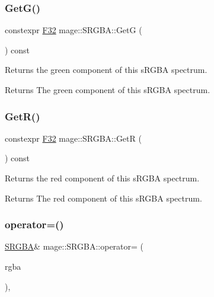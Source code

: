 \subsubsection{\texorpdfstring{Get\+G()}{GetG()}}
{\footnotesize\ttfamily constexpr \mbox{\hyperlink{namespacemage_aa97e833b45f06d60a0a9c4fc22ae02c0}{F32}} mage\+::\+S\+R\+G\+B\+A\+::\+GetG (\begin{DoxyParamCaption}{ }\end{DoxyParamCaption}) const\hspace{0.3cm}{\ttfamily [noexcept]}}

Returns the green component of this s\+R\+G\+BA spectrum.

\begin{DoxyReturn}{Returns}
The green component of this s\+R\+G\+BA spectrum. 
\end{DoxyReturn}
\mbox{\label{structmage_1_1_s_r_g_b_a_a7f88a4619ba00d7a8d8b33e5f07b3b81}} 
\subsubsection{\texorpdfstring{Get\+R()}{GetR()}}
{\footnotesize\ttfamily constexpr \mbox{\hyperlink{namespacemage_aa97e833b45f06d60a0a9c4fc22ae02c0}{F32}} mage\+::\+S\+R\+G\+B\+A\+::\+GetR (\begin{DoxyParamCaption}{ }\end{DoxyParamCaption}) const\hspace{0.3cm}{\ttfamily [noexcept]}}

Returns the red component of this s\+R\+G\+BA spectrum.

\begin{DoxyReturn}{Returns}
The red component of this s\+R\+G\+BA spectrum. 
\end{DoxyReturn}
\mbox{\label{structmage_1_1_s_r_g_b_a_ac21035a9eadad3c0d78364b17692e4fc}} 
\subsubsection{\texorpdfstring{operator=()}{operator=()}\hspace{0.1cm}{\footnotesize\ttfamily [1/2]}}
{\footnotesize\ttfamily \mbox{\hyperlink{structmage_1_1_s_r_g_b_a}{S\+R\+G\+BA}}\& mage\+::\+S\+R\+G\+B\+A\+::operator= (\begin{DoxyParamCaption}\item[{const \mbox{\hyperlink{structmage_1_1_s_r_g_b_a}{S\+R\+G\+BA}} \&}]{rgba }\end{DoxyParamCaption})\hspace{0.3cm}{\ttfamily [default]}, {\ttfamily [noexcept]}}

